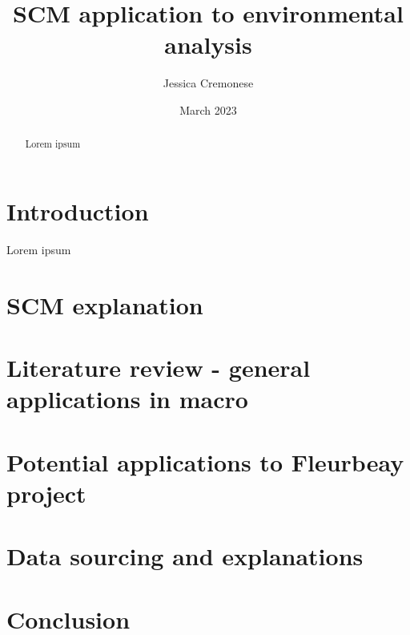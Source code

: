\documentclass[12pt,a4paper,draft]{article}
\begin{document}
\begin{titlepage}
\title{SCM application to environmental analysis}
\author{Jessica Cremonese}
\date{March 2023}
\maketitle
\end{titlepage}

\tableofcontents

\newpage
\begin{abstract}
    Lorem ipsum
\end{abstract}
\newpage


\section{Introduction}
Lorem ipsum

\section{SCM explanation}

\section{Literature review - general applications in macro}

\section{Potential applications to Fleurbeay project}

\section{Data sourcing and explanations}

\section{Conclusion}
\end{document}
